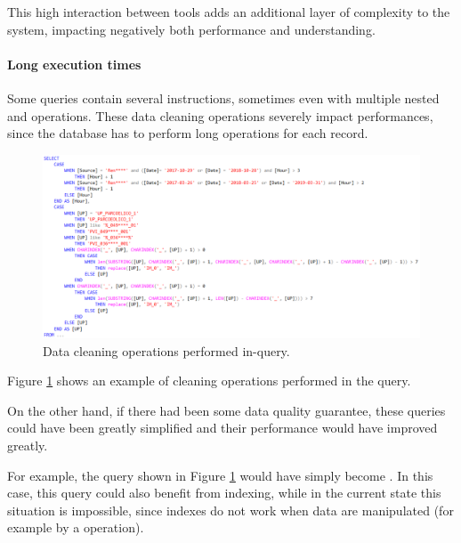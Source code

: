         This high interaction between tools adds an additional layer of complexity to the system, impacting negatively both performance and understanding.
        
    \paragraph{Long execution times}
        Some queries contain several  instructions, sometimes even with multiple nested  and  operations.
        These data cleaning operations severely impact performances, since the database has to perform long operations for each record.
        
        \begin{figure}
            \centering
            \includegraphics[width=\textwidth]{res/bigdata_query_casewhen.png}
            \caption{Data cleaning operations performed in-query.}
            \label{fig:query_cleanup_casewhen}
        \end{figure}
        
        Figure \ref{fig:query_cleanup_casewhen} shows an example of cleaning operations performed in the query.
        
        On the other hand, if there had been some data quality guarantee, these queries could have been greatly simplified and their performance would have improved greatly.
        
        For example, the query shown in Figure \ref{fig:query_cleanup_casewhen} would have simply become .
        In this case, this query could also benefit from indexing, while in the current state this situation is impossible, since indexes do not work when data are manipulated (for example by a  operation).
